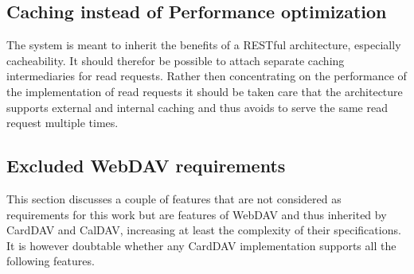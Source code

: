 \documentclass[11pt,a4paper,headsepline,twoside]{scrartcl}		%
\begin{document}




\subsection{Caching instead of Performance optimization}
The system is meant to inherit the benefits of a RESTful architecture,
especially cacheability. It should therefor be possible to attach separate
caching intermediaries for read requests. Rather then concentrating on the
performance of the implementation of read requests it should be taken care that
the architecture supports external and internal caching and thus avoids to serve
the same read request multiple times.

\subsection{Excluded WebDAV requirements}
\label{sec:excluded-requirements}

This section discusses a couple of features that are not considered as
requirements for this work but are features of WebDAV and thus inherited by
CardDAV and CalDAV, increasing at least the complexity of their
specifications. It is however doubtable whether any CardDAV implementation
supports all the following features.
\end{document}
